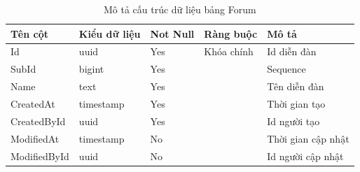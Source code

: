 \documentclass[../index.tex]{subfiles}
\begin{document}
    \begin{table}[H]
        \begin{tabular}{ |p{3cm}|p{2.5cm}|p{1.6cm}|p{2.2cm}|p{3cm}| }
            \hline
            Tên cột      & Kiểu dữ liệu             & Not Null & Ràng buộc  & Mô tả              \\
            \hline
            Id           & uuid                     & Yes      & Khóa chính & Id diễn đàn        \\
            \hline
            SubId        & bigint                   & Yes      &            & Sequence           \\
            \hline
            Name         & text    & Yes      &            & Tên diễn đàn       \\
            \hline
            CreatedAt    & timestamp & Yes      &            & Thời gian tạo      \\
            \hline
            CreatedById  & uuid                     & Yes      &            & Id người tạo       \\
            \hline
            ModifiedAt   & timestamp & No       &            & Thời gian cập nhật \\
            \hline
            ModifiedById & uuid                     & No       &            & Id người cập nhật  \\
            \hline
        \end{tabular}
        \caption{Mô tả cấu trúc dữ liệu bảng Forum}
    \end{table}
\end{document}
